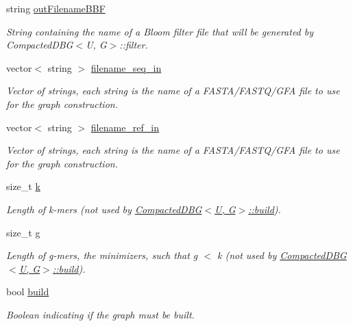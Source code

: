 \begin{DoxyCompactItemize}
string \hyperlink{structCDBG__Build__opt_aa10751be5fcf01b1686cce66ebab733e}{out\+Filename\+B\+BF}
\begin{DoxyCompactList}\small\item\em String containing the name of a Bloom filter file that will be generated by Compacted\+D\+B\+G$<$\+U, G$>$\+::filter. \end{DoxyCompactList}\item 
vector$<$ string $>$ \hyperlink{structCDBG__Build__opt_abb43cea644ca04c5ed0c3034b03c70d4}{filename\+\_\+seq\+\_\+in}
\begin{DoxyCompactList}\small\item\em Vector of strings, each string is the name of a F\+A\+S\+T\+A/\+F\+A\+S\+T\+Q/\+G\+FA file to use for the graph construction. \end{DoxyCompactList}\item 
vector$<$ string $>$ \hyperlink{structCDBG__Build__opt_a4d0d3e899b64c6bbc9e5913375ba40e3}{filename\+\_\+ref\+\_\+in}
\begin{DoxyCompactList}\small\item\em Vector of strings, each string is the name of a F\+A\+S\+T\+A/\+F\+A\+S\+T\+Q/\+G\+FA file to use for the graph construction. \end{DoxyCompactList}\item 
size\+\_\+t \hyperlink{structCDBG__Build__opt_af59eb333394387f84dcf35ab740bd482}{k}
\begin{DoxyCompactList}\small\item\em Length of k-\/mers (not used by \hyperlink{classCompactedDBG_a6021ad2fe7b11998b886bc5fd9e1a4ba}{Compacted\+D\+B\+G$<$\+U, G$>$\+::build}). \end{DoxyCompactList}\item 
size\+\_\+t \hyperlink{structCDBG__Build__opt_ab8d8ec72715094561d247b45ed5887f0}{g}
\begin{DoxyCompactList}\small\item\em Length of g-\/mers, the minimizers, such that g $<$ k (not used by \hyperlink{classCompactedDBG_a6021ad2fe7b11998b886bc5fd9e1a4ba}{Compacted\+D\+B\+G$<$\+U, G$>$\+::build}). \end{DoxyCompactList}\item 
bool \hyperlink{structCDBG__Build__opt_af2d14fa2147c3353d545a3ab970b683e}{build}
\begin{DoxyCompactList}\small\item\em Boolean indicating if the graph must be built. \end{DoxyCompactList}\item 

\end{DoxyCompactItemize}
